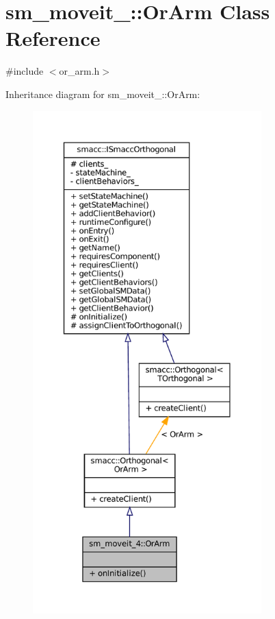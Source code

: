 \hypertarget{classsm__moveit__4_1_1OrArm}{}\section{sm\+\_\+moveit\+\_\+:\+:Or\+Arm Class Reference}
\label{classsm__moveit__4_1_1OrArm}


{\ttfamily \#include $<$or\+\_\+arm.\+h$>$}



Inheritance diagram for sm\+\_\+moveit\+\_\+:\+:Or\+Arm\+:
\nopagebreak
\begin{figure}[H]
\begin{center}
\leavevmode
\includegraphics[height=550pt]{classsm__moveit__4_1_1OrArm__inherit__graph}
\end{center}
\end{figure}


